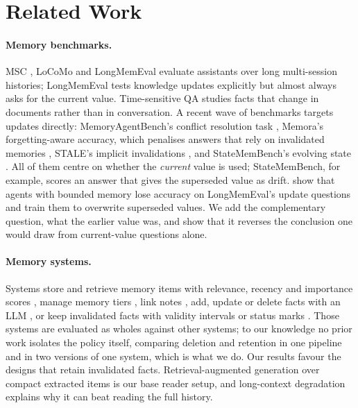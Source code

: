 \documentclass[11pt]{article}
\begin{document}
\section{Related Work}

\paragraph{Memory benchmarks.} MSC \citep{xu2022goldfish}, LoCoMo \citep{maharana2024locomo} and
LongMemEval \citep{wu2025longmemeval} evaluate assistants over long multi-session histories;
LongMemEval tests knowledge updates explicitly but almost always asks for the current value.
Time-sensitive QA \citep{chen2021timeqa} studies facts that change in documents rather than in
conversation. A recent wave of benchmarks targets updates directly: MemoryAgentBench's conflict
resolution task \citep{hu2026memoryagentbench}, Memora's forgetting-aware accuracy, which penalises
answers that rely on invalidated memories \citep{uddin2026memora}, STALE's implicit invalidations
\citep{chao2026stale}, and StateMemBench's evolving state \citep{fan2026statemem}. All of them centre
on whether the \emph{current} value is used; StateMemBench, for example, scores an answer that
gives the superseded value as drift.
\citet{patel2026supersede} show that agents with bounded memory lose accuracy on LongMemEval's
update questions and train them to overwrite superseded values. We add the complementary question,
what the earlier value was, and show that it reverses the conclusion one would draw from
current-value questions alone.

\paragraph{Memory systems.} Systems store and retrieve memory items with relevance, recency and
importance scores \citep{park2023generative,zhong2024memorybank}, manage memory tiers
\citep{packer2023memgpt}, link notes \citep{xu2025amem}, add, update or delete facts with an LLM
\citep{chhikara2025mem0,yan2026memoryr1}, or keep invalidated facts with validity intervals or
status marks \citep{rasmussen2025zep,wan2026sodamem,fan2026statemem}. Those systems are evaluated as
wholes against other systems; to our knowledge no prior work isolates the policy itself, comparing
deletion and retention in one pipeline and in two versions of one system, which is what we do. Our
results favour the designs that retain invalidated facts. Retrieval-augmented generation \citep{lewis2020rag} over
compact extracted items is our base reader setup, and long-context degradation \citep{liu2024lost}
explains why it can beat reading the full history.
\end{document}
